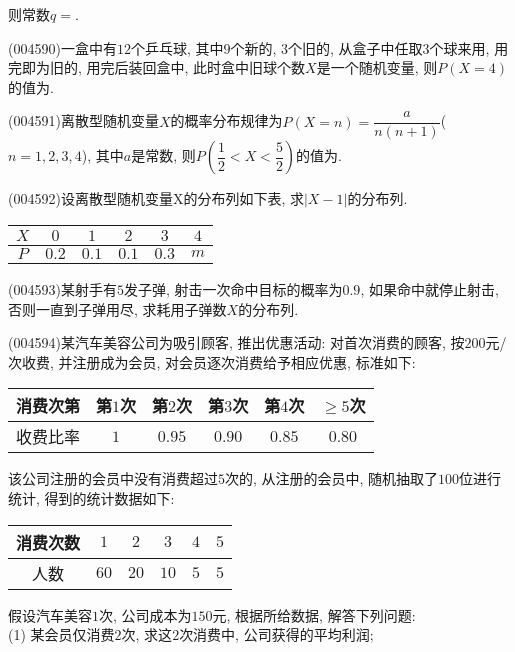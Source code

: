 则常数$q=$.
\item (004590)一盒中有$12$个乒乓球, 其中$9$个新的, $3$个旧的, 从盒子中任取$3$个球来用, 用完即为旧的, 用完后装回盒中, 此时盒中旧球个数$X$是一个随机变量, 则$P(X=4)$的值为.
\item (004591)离散型随机变量$X$的概率分布规律为$P(X=n)=\dfrac{a}{n(n+1)}$($n=1, 2, 3, 4$), 其中$a$是常数, 则$P(\dfrac 12<X<\dfrac 52)$的值为.
\item (004592)设离散型随机变量X的分布列如下表, 求$|X-1|$的分布列.
\begin{center}
    \begin{tabular}{|c|c|c|c|c|c|}
        \hline
        $X$	& $0$ & $1$ & $2$ & $3$ & $4$ \\ \hline
        $P$	& $0.2$ & $0.1$ & $0.1$ & $0.3$ & $m$ \\ \hline
    \end{tabular}
\end{center}
\item (004593)某射手有$5$发子弹, 射击一次命中目标的概率为$0.9$, 如果命中就停止射击, 否则一直到子弹用尽, 求耗用子弹数$X$的分布列.
\item (004594)某汽车美容公司为吸引顾客, 推出优惠活动: 对首次消费的顾客, 按$200$元/次收费, 并注册成为会员, 对会员逐次消费给予相应优惠, 标准如下:\\
\begin{center}
    \begin{tabular}{|c|c|c|c|c|c|}
        \hline
        消费次第 & 第$1$次 & 第$2$次 & 第$3$次 & 第$4$次 & $\ge 5$次 \\ \hline
        收费比率 & $1$ & $0.95$ & $0.90$ & $0.85$ & $0.80$\\ \hline
    \end{tabular}
\end{center}
该公司注册的会员中没有消费超过$5$次的, 从注册的会员中, 随机抽取了$100$位进行统计, 得到的统计数据如下:
\begin{center}
    \begin{tabular}{|c|c|c|c|c|c|}
        \hline
        消费次数 & $1$ & $2$ & $3$ & $4$ & $5$ \\ \hline
        人数 & $60$ & $20$ & $10$ & $5$ & $5$\\ \hline
    \end{tabular}
\end{center}
假设汽车美容$1$次, 公司成本为$150$元, 根据所给数据, 解答下列问题:\\
(1) 某会员仅消费$2$次, 求这$2$次消费中, 公司获得的平均利润;\\
